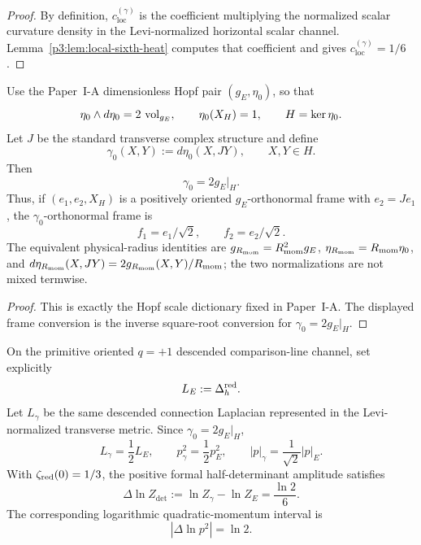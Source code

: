 \documentclass[12pt,a4paper]{article}
\begin{document}
\begin{proof}
By definition, \(c_{\mathrm{loc}}^{(\gamma)}\) is the coefficient multiplying the normalized scalar curvature density in the Levi-normalized horizontal scalar channel.  Lemma~\ref{p3:lem:local-sixth-heat} computes that coefficient and gives \(c_{\mathrm{loc}}^{(\gamma)}=1/6\).
\end{proof}

\begin{lemma}
\label{p3:lem:levi-vs-round}
Use the Paper~I-A dimensionless Hopf pair \((g_E,\eta_0)\), so that
\[
  \eta_0\wedge d\eta_0=2\,\operatorname{vol}_{g_E},
  \qquad \eta_0(X_H)=1,
  \qquad H=\ker\eta_0.
\]
Let \(J\) be the standard transverse complex structure and define
\[
  \gamma_0(X,Y):=d\eta_0(X,JY),\qquad X,Y\in H.
\]
Then
\begin{equation}
\label{p3:eq:levi-vs-round}
  \boxed{\gamma_0=2g_E|_H}.
\end{equation}
Thus, if \((e_1,e_2,X_H)\) is a positively oriented \(g_E\)-orthonormal
frame with \(e_2=Je_1\), the \(\gamma_0\)-orthonormal frame is
\begin{equation}
\label{p3:eq:levi-frame-conversion}
  f_1=e_1/\sqrt2,\qquad f_2=e_2/\sqrt2.
\end{equation}
The equivalent physical-radius identities are
\(g_{R_{\mathrm{mom}}}=R_{\mathrm{mom}}^2g_E\), \(\eta_{R_{\mathrm{mom}}}=R_{\mathrm{mom}}\eta_0\), and
\(d\eta_{R_{\mathrm{mom}}}(X,JY)=2g_{R_{\mathrm{mom}}}(X,Y)/R_{\mathrm{mom}}\); the two normalizations are not
mixed termwise.
\end{lemma}

\begin{proof}
This is exactly the Hopf scale dictionary fixed in Paper~I-A.  The displayed
frame conversion is the inverse square-root conversion for
\(\gamma_0=2g_E|_H\).
\end{proof}


\begin{lemma}
\label{p3:lem:levi-round-linear-amplitude}
On the primitive oriented \(q=+1\) descended comparison-line channel, set explicitly
\[
        L_E:=\Delta_h^{\rm red}.
\]
Let \(L_\gamma\) be the same descended connection Laplacian represented in
the Levi-normalized transverse metric.  Since
\(\gamma_0=2g_E|_H\),
\[
 L_\gamma=\frac12L_E,
 \qquad
 p_\gamma^2=\frac12p_E^2,
 \qquad
 |p|_\gamma=\frac1{\sqrt2}|p|_E.
\]
With \(\zeta_{\rm red}(0)=1/3\), the positive formal half-determinant amplitude
satisfies
\begin{equation}
\label{p3:eq:integrated-det-anomaly}
 \Delta\ln Z_{\det}
 :=\ln Z_\gamma-\ln Z_E
 =\frac{\ln2}{6}.
\end{equation}
The corresponding logarithmic quadratic-momentum interval is
\begin{equation}
\label{p3:eq:quadratic-momentum-interval}
 |\Delta\ln p^2|=\ln2.
\end{equation}
\end{lemma}
\end{document}
